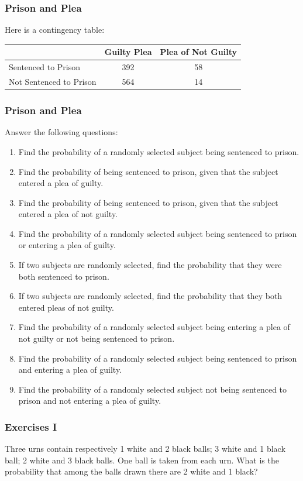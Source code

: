 \documentclass[xcolor=dvipsnames]{beamer}
\begin{document}
\begin{frame}
  \frametitle{Prison and Plea}
Here is a contingency table:
\begin{tabular}{|l|c|c|}\hline
  & Guilty Plea & Plea of Not Guilty \\ \hline
  Sentenced to Prison & 392 & 58 \\ \hline
  Not Sentenced to Prison & 564 & 14 \\ \hline
\end{tabular}
\end{frame}

\begin{frame}
  \frametitle{Prison and Plea}
Answer the following questions:
\begin{enumerate}
\item<1-> Find the probability of a randomly selected subject being
  sentenced to prison.
\item<2-> Find the probability of being sentenced to prison, given
  that the subject entered a plea of guilty.
\item<3-> Find the probability of being sentenced to prison, given
  that the subject entered a plea of not guilty.
\item<4-> Find the probability of a randomly selected subject being
  sentenced to prison or entering a plea of guilty.
\item<5-> If two subjects are randomly selected, find the probability
  that they were both sentenced to prison.
\item<6-> If two subjects are randomly selected, find the probability
  that they both entered pleas of not guilty.
\item<7-> Find the probability of a randomly selected subject being
  entering a plea of not guilty or not being sentenced to prison.
\item<8-> Find the probability of a randomly selected subject being
  sentenced to prison and entering a plea of guilty.
\item<9-> Find the probability of a randomly selected subject not being
  sentenced to prison and not entering a plea of guilty.
\end{enumerate}
\end{frame}

\begin{frame}
  \frametitle{Exercises I}
Three urns contain respectively 1 white and 2 black balls; 3 white and
1 black ball; 2 white and 3 black balls. One ball is taken from each
urn. What is the probability that among the balls drawn there are 2
white and 1 black?
\end{frame}
\end{document}
